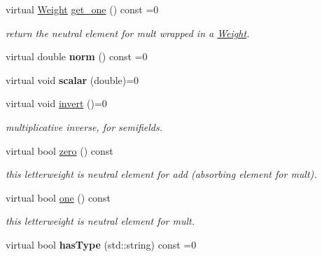 \begin{DoxyCompactItemize}
\mbox{\label{classLetterWeight_a4660750188a19b63b24569b6a584a5ca}} 
virtual \mbox{\hyperlink{classWeight}{Weight}} \mbox{\hyperlink{classLetterWeight_a4660750188a19b63b24569b6a584a5ca}{get\+\_\+one}} () const =0
\begin{DoxyCompactList}\small\item\em return the neutral element for mult wrapped in a \mbox{\hyperlink{classWeight}{Weight}}. \end{DoxyCompactList}\item 
\mbox{\label{classLetterWeight_a6ec9398f9fc437e222207644056fb4de}} 
virtual double {\bfseries norm} () const =0
\item 
\mbox{\label{classLetterWeight_aef0e684851ba69336a3e86c93c5a6a58}} 
virtual void {\bfseries scalar} (double)=0
\item 
\mbox{\label{classLetterWeight_a76a013deb82c8c1511cb6a68e5a06218}} 
virtual void \mbox{\hyperlink{classLetterWeight_a76a013deb82c8c1511cb6a68e5a06218}{invert}} ()=0
\begin{DoxyCompactList}\small\item\em multiplicative inverse, for semifields. \end{DoxyCompactList}\item 
virtual bool \mbox{\hyperlink{group__weight_gabaad113da06b47c4b291558d05da6aa6}{zero}} () const
\begin{DoxyCompactList}\small\item\em this letterweight is neutral element for add (absorbing element for mult). \end{DoxyCompactList}\item 
virtual bool \mbox{\hyperlink{group__weight_ga53200866c20ae5e4aae7ab8acd8f3ad0}{one}} () const
\begin{DoxyCompactList}\small\item\em this letterweight is neutral element for mult. \end{DoxyCompactList}\item 
\mbox{\label{classLetterWeight_a7c087b5999657545934b72660928a2ee}} 
virtual bool {\bfseries has\+Type} (std\+::string) const =0
\end{DoxyCompactItemize}
